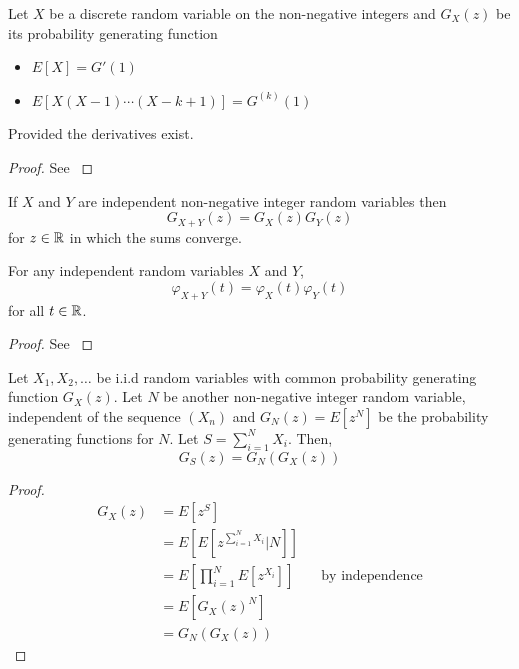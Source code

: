 \begin{theorem}
Let $X$ be a discrete random variable on the non-negative integers and $G_X(z)$ be its probability generating function
\begin{itemize}
    \item $E[X] = G'(1)$
    \item $E[X (X - 1) \cdots (X - k + 1)] = G^{(k)}(1)$
\end{itemize}
Provided the derivatives exist.
\end{theorem}

\begin{proof}
See \cite{grimmett2001}
\end{proof}

\begin{theorem}
If $X$ and $Y$ are independent non-negative integer random variables then
$$
G_{X + Y}(z) = G_X(z) G_Y(z)
$$
for $z \in \mathbb{R}$ in which the sums converge.
\end{theorem}

\begin{theorem}
For any independent random variables $X$ and $Y$,
$$
\varphi_{X + Y}(t) = \varphi_X(t) \varphi_Y(t)
$$
for all $t \in \mathbb{R}$.
\end{theorem}

\begin{proof}
See \cite{grimmett2001}
\end{proof}

\begin{theorem}\label{thm:generating_random_sum}
Let $X_1, X_2, \ldots$ be i.i.d random variables with common probability generating function $G_X(z)$.
Let $N$ be another non-negative integer random variable, independent of the sequence $(X_n)$ and $G_N(z) = E[z^N]$ be the probability generating functions for $N$.
Let $S = \sum_{i = 1}^N X_i$.
Then,
$$
G_S(z) = G_N(G_X(z))
$$
\end{theorem}

\begin{proof}
\begin{align*}
    G_X(z) &= E[ z^S ]\\
    &= E[ E[ z^{\sum_{i = 1}^N X_i} | N ]]\\
    &= E \left[ \prod_{i = 1}^N E[z^{X_i}] \right] && \text{by independence}\\
    &= E[ G_X(z)^N]\\
    &= G_N(G_X(z))
\end{align*}
\end{proof}

